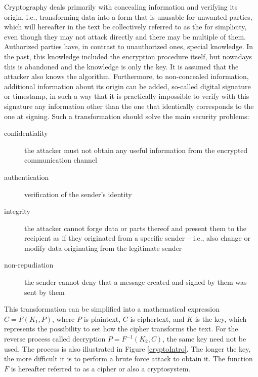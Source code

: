 %
%
%
%
%
%
Cryptography \cite{yokohama, bethany} deals primarily
with concealing information and verifying its origin,
i.e., transforming data into a form that
is unusable for unwanted parties, which will hereafter
 in the text be collectively referred to as the  for simplicity, even though they may not attack directly
 and there may be multiple of them. Authorized parties have, in contrast to unauthorized ones, special knowledge.
 In the past, this knowledge included the encryption procedure itself, but nowadays this is abandoned and
 the knowledge is only the key. It is assumed that the attacker also knows the algorithm. Furthermore, to non-concealed
 information, additional information about its origin can be added,
 so-called digital signature or timestamp, in such a way that
 it is practically impossible to verify with this signature any information other than the one that identically corresponds to the one at signing.
Such a transformation should solve the main security problems:
\begin{description}
  \item[confidentiality] the attacker must not obtain any useful information from the encrypted
  communication channel
  \item[authentication] verification of the sender's identity
  \item[integrity] the attacker cannot forge data or parts thereof and present them to the recipient as if they originated
    from a specific sender -- i.e., also change or modify data originating from the legitimate sender
  \item[non-repudiation] the sender cannot deny that a message created and signed by them was sent by them
\end{description}

This transformation can be simplified into a mathematical expression $C = F(K_1,P)$, where $P$
is plaintext, $C$ is ciphertext,
and $K$ is the key, which represents the possibility to set how the cipher transforms the text.
For the reverse process called decryption $P = F^{-1}(K_2,C)$, the same key need not be used.
The process is also illustrated in Figure \ref{cryptoIntro}.
The longer the key, the more difficult it is to perform a brute force attack to obtain it.
The function $F$ is hereafter referred to as a cipher or also a cryptosystem.

